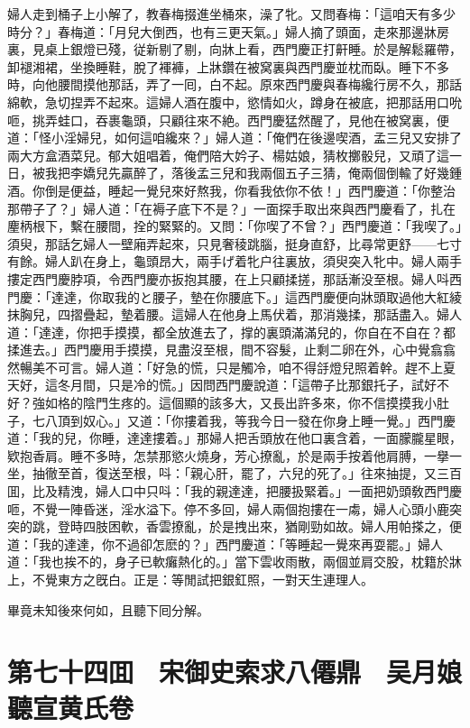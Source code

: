 婦人走到桶子上小解了，教春梅掇進坐桶來，澡了牝。又問春梅：「這咱天有多少時分？」春梅道：「月兒大倒西，也有三更天氣。」婦人摘了頭面，走來那邊牀房裏，見桌上銀燈已殘，従新剔了剔，向牀上看，西門慶正打鼾睡。於是解鬆羅帶，卸褪湘裙，坐換睡鞋，脫了褌褲，上牀鑽在被窝裏與西門慶並枕而臥。睡下不多時，向他腰間摸他那話，弄了一囘，白不起。原來西門慶與春梅纔行房不久，那話綿軟，急切捏弄不起來。這婦人酒在腹中，慾情如火，蹲身在被底，把那話用口吮咂，挑弄蛙口，吞裹龜頭，只顧往來不絶。西門慶猛然醒了，見他在被窝裏，便道：「怪小淫婦兒，如何這咱纔來？」婦人道：「俺們在後邊喫酒，孟三兒又安排了兩大方盒酒菜兒。郁大姐唱着，俺們陪大妗子、楊姑娘，猜枚擲骰兒，又頑了這一日，被我把李嬌兒先贏醉了，落後孟三兒和我兩個五子三猜，俺兩個倒輸了好幾鍾酒。你倒是便益，睡起一覺兒來好熬我，你看我依你不依！」西門慶道：「你整治那帶子了？」婦人道：「在褥子底下不是？」一面探手取出來與西門慶看了，扎在麈柄根下，繫在腰間，拴的緊緊的。又問：「你喫了不曾？」西門慶道：「我喫了。」須臾，那話乞婦人一壁廂弄起來，只見奢稜跳腦，挺身直舒，比尋常更舒——七寸有餘。婦人趴在身上，龜頭昂大，兩手げ着牝户往裏放，須臾突入牝中。婦人兩手摟定西門慶脖項，令西門慶亦扳抱其腰，在上只顧揉搓，那話漸没至根。婦人呌西門慶：「達達，你取我的と腰子，墊在你腰底下。」這西門慶便向牀頭取過他大紅綾抹胸兒，四摺疊起，墊着腰。這婦人在他身上馬伏着，那消幾揉，那話盡入。婦人道：「達達，你把手摸摸，都全放進去了，撑的裏頭滿滿兒的，你自在不自在？都揉進去。」西門慶用手摸摸，見盡沒至根，間不容髮，止剩二卵在外，心中覺翕翕然暢美不可言。婦人道：「好急的慌，只是觸冷，咱不得㧱燈兒照着幹。趕不上夏天好，這冬月間，只是冷的慌。」因問西門慶說道：「這帶子比那銀托子，試好不好？強如格的陰門生疼的。這個顯的該多大，又長出許多來，你不信摸摸我小肚子，七八頂到奴心。」又道：「你摟着我，等我今日一發在你身上睡一覺。」西門慶道：「我的兒，你睡，達達摟着。」那婦人把舌頭放在他口裏含着，一面朦朧星眼，欵抱香肩。睡不多時，怎禁那慾火燒身，芳心撩亂，於是兩手按着他肩膊，一擧一坐，抽徹至首，復送至根，呌：「親心肝，罷了，六兒的死了。」往來抽提，又三百囬，比及精洩，婦人口中只呌：「我的親達達，把腰扱緊着。」一面把奶頭敎西門慶咂，不覺一陣昏迷，淫水溢下。停不多回，婦人兩個抱摟在一䖏，婦人心頭小鹿突突的跳，登時四肢困軟，香雲撩亂，於是拽出來，猶剛勁如故。婦人用帕搽之，便道：「我的達達，你不過卻怎麽的？」西門慶道：「等睡起一覺來再耍罷。」婦人道：「我也挨不的，身子已軟癱熱化的。」當下雲收雨散，兩個並肩交股，枕籍於牀上，不覺東方之旣白。正是：等閒試把銀釭照，一對天生連理人。

畢竟未知後來何如，且聽下囘分解。

\chapter*{第七十四囬　宋御史索求八僊鼎　吴月娘聽宣黄氏卷}

